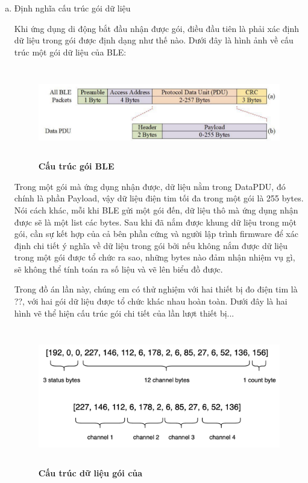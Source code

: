 \begin{enumerate} [a)]
  \item Định nghĩa cấu trúc gói dữ liệu

    Khi ứng dụng di động bắt đầu nhận được gói, điều đầu tiên là phải xác định dữ liệu trong gói được định dạng như thế nào.
    Dưới đây là hình ảnh về cấu trúc một gói dữ liệu của BLE:
    \begin{figure}[H]
      \centering
      \includegraphics[width=14cm,height=4cm]{Images/mobile_app/ecg_calculation/preview_packet.png}
      \caption[Cấu trúc gói BLE]{\bfseries \fontsize{12pt}{0pt}
      \selectfont Cấu trúc gói BLE}
      \label{preview_packet} %
    \end{figure}
    Trong một gói mà ứng dụng nhận được, dữ liệu nằm trong DataPDU, đó chính là phần Payload, vậy dữ liệu điện tim tối đa
    trong một gói là 255 bytes. Nói cách khác, mỗi khi BLE gửi một gói đến, dữ liệu thô mà ứng dụng nhận được sẽ là một
    list các bytes. Sau khi đã nắm được khung dữ liệu trong một gói, cần sự kết hợp của cả bên phần cứng 
    và người lập trình firmware để xác định chi tiết ý nghĩa về dữ liệu trong gói bởi nếu không nắm được dữ liệu
    trong một gói được tổ chức ra sao, những bytes nào đảm nhận nhiệm vụ gì, sẽ không thể tính toán ra số liệu và vẽ lên biểu
    đồ được.
    
    Trong đồ án lần này, chúng em có thử nghiệm với hai thiết bị đo điện tim là ??, với hai gói dữ liệu được tổ chức khác nhau
    hoàn toàn. Dưới đây là hai hình vẽ thể hiện cấu trúc gói chi tiết của lần lượt thiết bị...

    \begin{figure}[H]
      \centering
      \includegraphics[width=15cm,height=6cm]{Images/mobile_app/ecg_calculation/data_packet_all.png}
      \caption[Cấu trúc dữ liệu gói của]{\bfseries \fontsize{12pt}{0pt}
      \selectfont Cấu trúc dữ liệu gói của}
      \label{data_packet_ecg} %
    \end{figure}


\end{enumerate}
